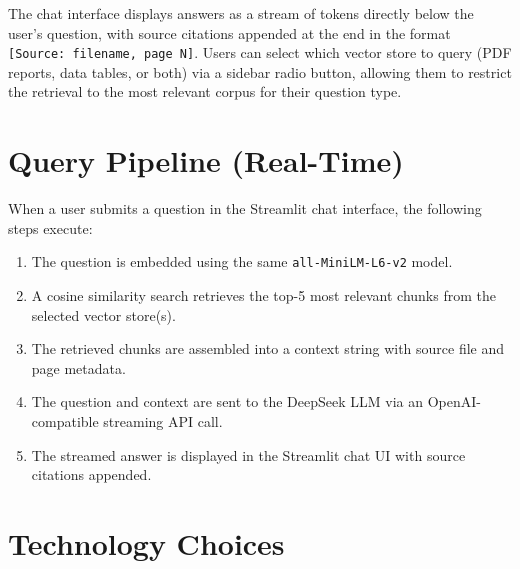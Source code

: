 \documentclass[12pt,a4paper]{report}
\begin{document}
\medskip
\noindent The chat interface displays answers as a stream of tokens directly below the user's question, with source citations appended at the end in the format \texttt{[Source: filename, page N]}. Users can select which vector store to query (PDF reports, data tables, or both) via a sidebar radio button, allowing them to restrict the retrieval to the most relevant corpus for their question type.

\section{Query Pipeline (Real-Time)}

When a user submits a question in the Streamlit chat interface, the following steps execute:
\begin{enumerate}
  \item The question is embedded using the same \texttt{all-MiniLM-L6-v2} model.
  \item A cosine similarity search retrieves the top-5 most relevant chunks from the selected vector store(s).
  \item The retrieved chunks are assembled into a context string with source file and page metadata.
  \item The question and context are sent to the DeepSeek LLM via an OpenAI-compatible streaming API call.
  \item The streamed answer is displayed in the Streamlit chat UI with source citations appended.
\end{enumerate}

\section{Technology Choices}
\end{document}
